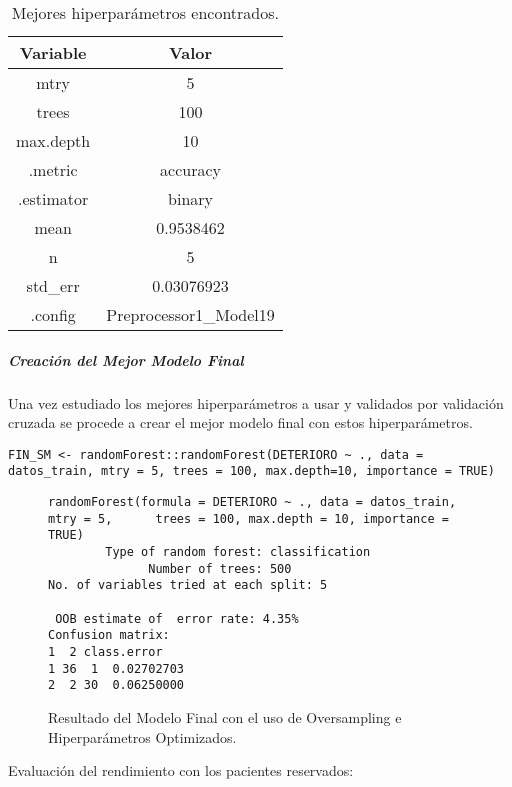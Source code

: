 \begin{table}[H]
    \centering
    \begin{tabular}{|c|c|}
        \hline
        \textbf{Variable} & \textbf{Valor} \\
        \hline
        mtry & 5 \\
        trees & 100 \\
        max.depth & 10 \\
        .metric & accuracy \\
        .estimator & binary \\
        mean & 0.9538462 \\
        n & 5 \\
        std\_err & 0.03076923 \\
        .config & Preprocessor1\_Model19 \\
        \hline
    \end{tabular}
    \caption{Mejores hiperparámetros encontrados.}
    \label{tabla:mejores_hiperparametros}
\end{table}

\newpage
\subparagraph{Creación del Mejor Modelo Final}

Una vez estudiado los mejores hiperparámetros a usar y validados por validación cruzada se procede a crear el mejor modelo final con estos hiperparámetros.

\begin{lstlisting}[style=mystyle]
    FIN_SM <- randomForest::randomForest(DETERIORO ~ ., data = datos_train, mtry = 5, trees = 100, max.depth=10, importance = TRUE)
\end{lstlisting}

\begin{figure}[H]
    \centering
    \begin{lstlisting}[frame=single, basicstyle=\small\ttfamily]
randomForest(formula = DETERIORO ~ ., data = datos_train, mtry = 5,      trees = 100, max.depth = 10, importance = TRUE) 
        Type of random forest: classification
              Number of trees: 500
No. of variables tried at each split: 5

 OOB estimate of  error rate: 4.35%
Confusion matrix:
1  2 class.error
1 36  1  0.02702703
2  2 30  0.06250000
    \end{lstlisting}
    \caption{Resultado del Modelo Final con el uso de Oversampling e Hiperparámetros Optimizados.}
    \label{fig:random_forest_FINAL_SMOTE_HIPER}
\end{figure}

Evaluación del rendimiento con los pacientes reservados: 

